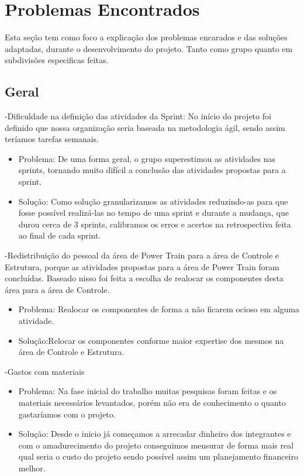 \chapter[Problemas Encontrados]{Problemas Encontrados}

Esta seção tem como foco a explicação dos problemas encarados e das soluções adaptadas, durante o desenvolvimento do projeto. Tanto como grupo quanto em subdivisões especificas feitas.

 \section{Geral}

-Dificuldade na definição das atividades da Sprint: No início do projeto foi definido que nossa organização seria baseada na metodologia ágil, sendo assim teríamos tarefas semanais.
    \begin{itemize}
      \item Problema: De uma forma geral, o grupo superestimou as atividades nas sprints, tornando muito difícil a conclusão das atividades propostas para a sprint.
	  \item Solução: Como solução granularizamos as atividades reduzindo-as para que fosse possível realizá-las no tempo de uma sprint e durante a mudança, que durou cerca de 3 sprints, calibramos os erros e acertos na retrospectiva feita ao final de cada sprint.

    \end{itemize}

-Redistribuição do pessoal da área de Power Train para a área de Controle e Estrutura, porque as atividades propostas para a área de Power Train foram concluídas. Baseado nisso foi feita a escolha de realocar os componentes desta área para a área de Controle.
    \begin{itemize}
      \item Problema: Realocar os componentes de forma a não ficarem ocioso em alguma atividade.
	  \item Solução:Relocar os componentes conforme maior expertise dos mesmos na área de Controle e Estrutura.

    \end{itemize}

-Gastos com materiais
    \begin{itemize}
  \item Problema: Na fase inicial do trabalho muitas pesquisas foram feitas e os materiais necessários levantados, porém não era de conhecimento o quanto gastaríamos com o projeto.
  \item Solução: Desde o inicio já começamos a arrecadar dinheiro dos integrantes e com o amadurecimento do projeto conseguimos mensurar de forma mais real qual seria o custo do projeto sendo possível assim um planejamento financeiro melhor.

    \end{itemize}

